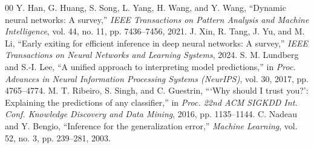 \documentclass[conference]{IEEEtran}
\begin{document}
\begin{thebibliography}{00}
 Y. Han, G. Huang, S. Song, L. Yang, H. Wang, and Y. Wang, ``Dynamic neural networks: A survey,'' \textit{IEEE Transactions on Pattern Analysis and Machine Intelligence}, vol. 44, no. 11, pp. 7436--7456, 2021.
 J. Xin, R. Tang, J. Yu, and M. Li, ``Early exiting for efficient inference in deep neural networks: A survey,'' \textit{IEEE Transactions on Neural Networks and Learning Systems}, 2024.
 S. M. Lundberg and S.-I. Lee, ``A unified approach to interpreting model predictions,'' in \textit{Proc. Advances in Neural Information Processing Systems (NeurIPS)}, vol. 30, 2017, pp. 4765--4774.
 M. T. Ribeiro, S. Singh, and C. Guestrin, ```Why should I trust you?': Explaining the predictions of any classifier,'' in \textit{Proc. 22nd ACM SIGKDD Int. Conf. Knowledge Discovery and Data Mining}, 2016, pp. 1135--1144.
 C. Nadeau and Y. Bengio, ``Inference for the generalization error,'' \textit{Machine Learning}, vol. 52, no. 3, pp. 239--281, 2003.
\end{thebibliography}
\end{document}
